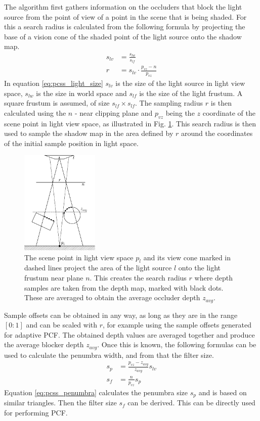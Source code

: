 The algorithm first gathers information on the occluders that block the light source from the point of view of a point in the scene that is being shaded. For this a search radius is calculated from the following formula by projecting the base of a vision cone of the shaded point of the light source onto the shadow map.
\begin{align}
	s_{lv} &= \frac{s_{lw}}{s_{lf}} \label{eq:pcss_light_size} \\[10pt] 
	r &= s_{lv} \cdot \frac{p_{vz} - n}{p_{vz}}
\end{align}
In equation \ref{eq:pcss_light_size} \(s_{lv}\) is the size of the light source in light view space, \(s_{lw}\) is the size in world space and \(s_{lf}\) is the size of the light frustum. A square frustum is assumed, of size \(s_{lf}\times s_{lf}\). The sampling radius \(r\) is then calculated using the \(n\) - near clipping plane and \(p_{vz}\) being the \(z\) coordinate of the scene point in light view space, as illustrated in Fig. \ref{fig:shadow_map_pcss_search}. This search radius is then used to sample the shadow map in the area defined by \(r\) around the coordinates of the initial sample position in light space.
\begin{figure}[hb]
    \centering
	\includegraphics[width=0.33\textwidth]{./graf/shadow_mapping_pcss_search.pdf}
	\caption{The scene point in light view space \(p_l\) and its view cone marked in dashed lines project the area of the light source \(l\) onto the light frustum near plane \(n\). This creates the search radius \(r\) where depth samples are taken from the depth map, marked with black dots. These are averaged to obtain the average occluder depth \(z_{avg}\).}
	\label{fig:shadow_map_pcss_search}
\end{figure}
Sample offsets can be obtained in any way, as long as they are in the range \([0:1]\) and can be scaled with \(r\), for example using the sample offsets generated for adaptive PCF. The obtained depth values are averaged together and produce the average blocker depth \(z_{avg}\). Once this is known, the following formulas can be used to calculate the penumbra width, and from that the filter size.
\begin{align}
	s_{p} &= \frac{p_{vz} - z_{avg}}{z_{avg}}s_{lv} \label{eq:pcss_penumbra} \\[10pt] 
	s_f &= \frac{n}{p_{vz}}s_{p}
\end{align}
Equation \ref{eq:pcss_penumbra} calculates the penumbra size \(s_{p}\) and is based on similar triangles. Then the filter size \(s_f\) can be derived. This can be directly used for performing PCF.

